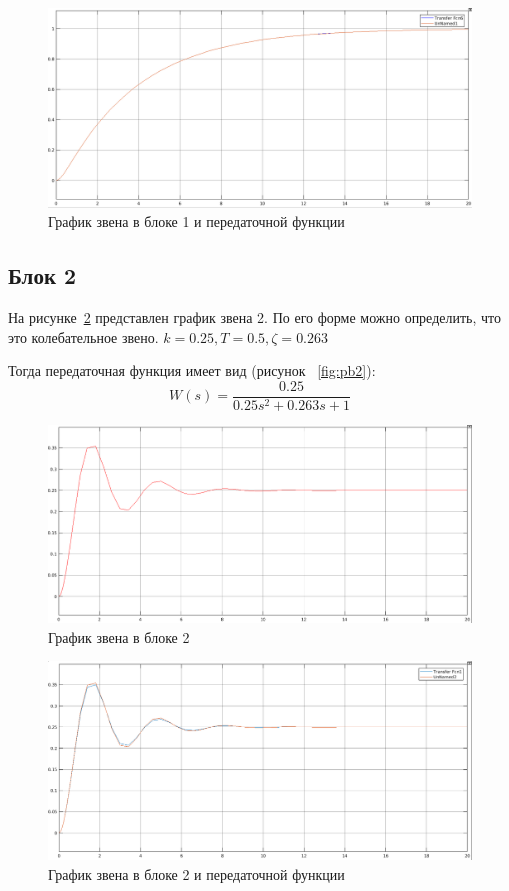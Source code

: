 \documentclass[12pt, a4paper] {ncc}
\begin{document}
    	\begin{figure}[ht!]
    		\includegraphics[scale=0.3]{./plot_both1.png}
			\caption{График звена в блоке 1 и передаточной функции}
			\label{fig:pb1}
    	\end{figure}

    \subsection{Блок 2}
		На рисунке~\ref{fig:p2} представлен график звена 2. По его форме можно определить,
		что это колебательное звено.
		$k = 0.25, T = 0.5, \zeta = 0.263$

		Тогда передаточная функция имеет вид (рисунок ~\ref{fig:pb2}):
		\[ W(s) = \dfrac {0.25} {0.25 s^2 + 0.263 s + 1}\]

    	\begin{figure}[ht!]
    		\includegraphics[scale=0.3]{./plot2.png}
			\caption{График звена в блоке 2}
			\label{fig:p2}
    	\end{figure}

    	\begin{figure}[ht!]
    		\includegraphics[scale=0.3]{./plot_both2.png}
			\caption{График звена в блоке 2 и передаточной функции}
			\label{fig:pb1}
    	\end{figure}
\end{document}
